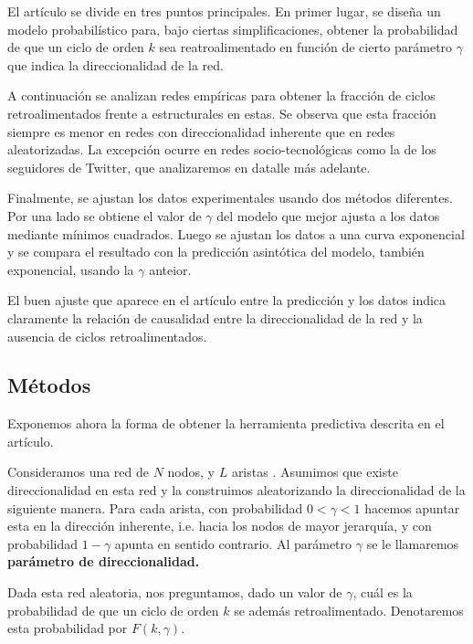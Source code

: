 \documentclass[1p]{elsarticle}
\begin{document}
    El artículo se divide en tres puntos principales.
    En primer lugar, se diseña un modelo probabilístico para, bajo ciertas simplificaciones, obtener la probabilidad de que un ciclo de orden $k$ sea reatroalimentado en función de cierto parámetro $\gamma$ que indica la direccionalidad de la red.

    A continuación se analizan redes empíricas para obtener la fracción de ciclos retroalimentados frente a estructurales en estas.
    Se observa que esta fracción siempre es menor en redes con direccionalidad inherente que en redes aleatorizadas. 
    La excepción ocurre en redes socio-tecnológicas como la de los seguidores de Twitter, que analizaremos en datalle más adelante.
 
    
    Finalmente, se ajustan los datos experimentales usando dos métodos diferentes.
    Por una lado se obtiene el valor de $\gamma$ del modelo que mejor ajusta a los datos mediante mínimos cuadrados.
    Luego se ajustan los datos a una curva exponencial y se compara el resultado con la predicción asintótica del modelo, también exponencial, usando la $\gamma$ anteior.

    El buen ajuste que aparece en el artículo entre la predicción y los datos indica claramente la relación de causalidad entre la direccionalidad de la red y la ausencia de ciclos retroalimentados.


\subsection{Métodos}
    Exponemos ahora la forma de obtener la herramienta predictiva descrita en el artículo.

    Consideramos una red de $N$ nodos, y $L$ aristas
    . 
    Asumimos que existe direccionalidad en esta red y la construimos aleatorizando la direccionalidad de la siguiente manera.
    Para cada arista, con probabilidad $0<\gamma<1$ hacemos apuntar esta en la dirección inherente, i.e. hacia los nodos de mayor jerarquía, y con probabilidad $1-\gamma$ apunta en sentido contrario.
    Al parámetro $\gamma$ se le llamaremos \textbf{parámetro de direccionalidad.}

    Dada esta red aleatoria, nos preguntamos, dado un valor de $\gamma$, cuál es la probabilidad de que un ciclo de orden $k$ se además retroalimentado. 
    Denotaremos esta probabilidad por $F(k, \gamma)$.
\end{document}
